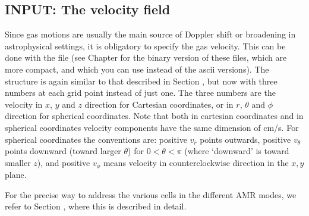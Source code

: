 \documentclass[letterpaper,10pt,english]{sphinxmanual}
\begin{document}
\subsection{INPUT: The velocity field}
\label{\detokenize{lineradtrans:input-the-velocity-field}}\label{\detokenize{lineradtrans:sec-velo-field}}
Since gas motions are usually the main source of Doppler shift or broadening in
astrophysical settings, it is obligatory to specify the gas velocity.  This can
be done with the file  (see Chapter {\hyperref[\detokenize{binaryio:chap-binary-io}]{}}
for the binary version of these files, which are more compact, and which you can
use instead of the ascii versions). The structure is again similar to that
described in Section {\hyperref[\detokenize{lineradtrans:sec-mol-numdensity}]{}}, but now with three numbers at
each grid point instead of just one. The three numbers are the velocity in
\(x\), \(y\) and \(z\) direction for Cartesian coordinates, or in
\(r\), \(\theta\) and \(\phi\) direction for spherical
coordinates. Note that both in cartesian coordinates and in spherical
coordinates  velocity components have the same dimension of cm/s. For
spherical coordinates the conventions are: positive \(v_r\) points outwards,
positive \(v_\theta\) points downward (toward larger \(\theta\)) for
\(0<\theta<\pi\) (where ‘downward’ is toward smaller \(z\)), and
positive \(v_\phi\) means velocity in counter\sphinxhyphen{}clockwise direction in the
\(x,y\)\sphinxhyphen{}plane.

For the precise way to address the various cells in the different AMR modes,
we refer to Section {\hyperref[\detokenize{inputoutputfiles:sec-dustdens}]{}}, where this is described in detail.
\end{document}
